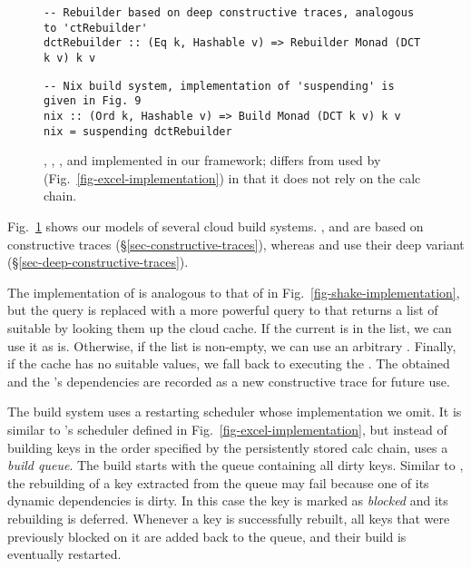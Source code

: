 \begin{figure}
\vspace{0mm}
\begin{verbatim}
-- Rebuilder based on deep constructive traces, analogous to 'ctRebuilder'
dctRebuilder :: (Eq k, Hashable v) => Rebuilder Monad (DCT k v) k v
\end{verbatim}
\vspace{0mm}
\begin{verbatim}
-- Nix build system, implementation of 'suspending' is given in Fig. 9
nix :: (Ord k, Hashable v) => Build Monad (DCT k v) k v
nix = suspending dctRebuilder
\end{verbatim}
\vspace{-2mm}
\caption{\Bazel, \Cloud \Shake, \CloudBuild, \Buck and \Nix implemented in
our framework;  differs from  used by \Excel
(Fig.~\ref{fig-excel-implementation}) in that it does not rely on the calc
chain.}
\label{fig-cloud-implementations}
\vspace{-2mm}
\end{figure}

Fig.~\ref{fig-cloud-implementations} shows our models of several cloud build
systems. \Bazel, \CloudBuild and \Cloud \Shake are based on constructive traces
(\S\ref{sec-constructive-traces}), whereas \Buck and \Nix use their deep
variant (\S\ref{sec-deep-constructive-traces}).

The implementation of  is analogous to that of 
in Fig.~\ref{fig-shake-implementation}, but the  query is replaced
with a more powerful query to  that returns a list of suitable
 by looking them up the cloud cache. If the current 
is in the list, we can use it as is. Otherwise, if the list is non-empty, we can
use an arbitrary . Finally, if the cache has no suitable values,
we fall back to executing the . The obtained  and the
's dependencies are recorded as a new constructive trace for future
use.

The \Bazel build system uses a restarting scheduler whose implementation we
omit. It is similar to \Excel's  scheduler defined in
Fig.~\ref{fig-excel-implementation}, but instead of building keys in the order
specified by the persistently stored calc chain, \Bazel uses a \emph{build
queue}. The build starts with the queue containing all dirty keys. Similar to
\Excel, the rebuilding of a key extracted from the queue may fail because one of
its dynamic dependencies is dirty. In this case the key is marked as
\emph{blocked} and its rebuilding is deferred. Whenever a key is successfully
rebuilt, all keys that were previously blocked on it are added back to the
queue, and their build is eventually restarted.

